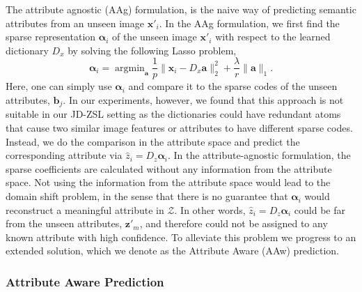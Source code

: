 \documentclass[letterpaper]{article} %
\def\x{\mathbf{x}}
\def\a{\mathbf{a}}
\def\z{\mathbf{z}}
\def\balpha{\boldsymbol{\alpha}}
\begin{document}
The attribute agnostic (AAg) formulation, is the naive way of predicting semantic attributes from an unseen image $\x'_i$. In the AAg formulation, we first find the sparse representation $\balpha_i$ of the unseen image $\x'_i$ with respect to the learned dictionary $D_x$ by solving the following Lasso problem, 
\begin{equation}
\balpha_i=\operatorname{argmin}_\a \frac{1}{p}\|\x_i-D_x\a\|_2^2 +\frac{\lambda}{r}\|\a\|_1.
\label{eq:attrAgn}
\end{equation}
Here, one can simply use $\balpha_i$ and compare it to the sparse codes of the unseen attributes, $\mathbf{b}_j$. In our experiments, however, we found that this approach is not suitable in our JD-ZSL setting as the dictionaries could have redundant atoms that cause two similar image features or attributes to have different sparse codes. Instead, we do the comparison in the attribute space and predict the corresponding attribute via $\hat{z}_i=D_z\balpha_i$. In the attribute-agnostic formulation,  the sparse coefficients are calculated without any information from the attribute space. Not using the information from the attribute space would lead to the domain shift problem, in the sense that there is no guarantee that $\balpha_i$ would reconstruct a meaningful attribute in $\mathcal{Z}$. In other words, $\hat{z}_i=D_z\balpha_i$ could be far from the unseen attributes, $\z'_m$, and therefore could not be assigned to any known attribute with high confidence. To alleviate this problem we progress to  an extended solution, which we denote as the Attribute Aware (AAw) prediction. %

\subsubsection{Attribute Aware Prediction}
\end{document}
